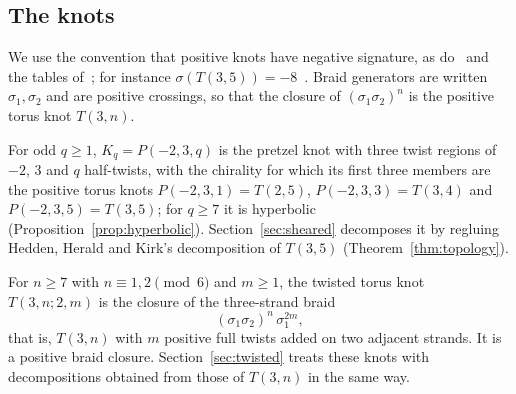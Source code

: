\subsection{The knots}\label{ss:knots}
We use the convention that positive knots have negative signature, as do~\cite{DS19,DS24,WuebbenV} and the tables
of~\cite{HHK2}; for instance $\sigma(T(3,5))=-8$~\cite[p.~60]{HHK2}. Braid generators are written $\sigma_1,\sigma_2$
and are positive crossings, so that the closure of $(\sigma_1\sigma_2)^n$ is the positive torus knot $T(3,n)$.

For odd $q\ge1$, $K_q=P(-2,3,q)$ is the pretzel knot with three twist regions of $-2$, $3$ and $q$ half-twists, with
the chirality for which its first three members are the positive torus knots $P(-2,3,1)=T(2,5)$,
$P(-2,3,3)=T(3,4)$ and $P(-2,3,5)=T(3,5)$; for $q\ge7$ it is hyperbolic (Proposition~\ref{prop:hyperbolic}). Section~\ref{sec:sheared}
decomposes it by regluing Hedden, Herald and Kirk's decomposition of $T(3,5)$ (Theorem~\ref{thm:topology}).

For $n\ge7$ with $n\equiv1,2\pmod 6$ and $m\ge1$, the twisted torus knot $T(3,n;2,m)$ is the closure of the
three-strand braid
\[
(\sigma_1\sigma_2)^n\,\sigma_1^{2m},
\]
that is, $T(3,n)$ with $m$ positive full twists added on two adjacent strands. It is a positive braid closure.
Section~\ref{sec:twisted} treats these knots with decompositions obtained from those of $T(3,n)$ in the same way.
